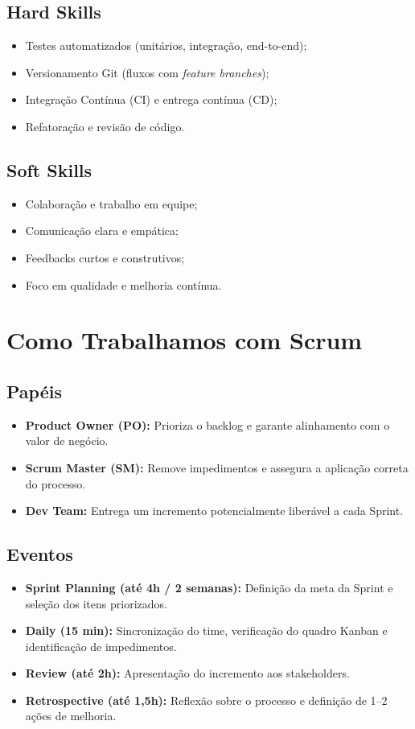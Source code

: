\documentclass{article}
\begin{document}
\subsection*{Hard Skills}
\begin{itemize}[noitemsep]
    \item Testes automatizados (unitários, integração, end-to-end);
    \item Versionamento Git (fluxos com \textit{feature branches});
    \item Integração Contínua (CI) e entrega contínua (CD);
    \item Refatoração e revisão de código.
\end{itemize}

\subsection*{Soft Skills}
\begin{itemize}[noitemsep]
    \item Colaboração e trabalho em equipe;
    \item Comunicação clara e empática;
    \item Feedbacks curtos e construtivos;
    \item Foco em qualidade e melhoria contínua.
\end{itemize}

\section{Como Trabalhamos com Scrum}

\subsection*{Papéis}
\begin{itemize}[noitemsep]
    \item \textbf{Product Owner (PO):} Prioriza o backlog e garante alinhamento com o valor de negócio.
    \item \textbf{Scrum Master (SM):} Remove impedimentos e assegura a aplicação correta do processo.
    \item \textbf{Dev Team:} Entrega um incremento potencialmente liberável a cada Sprint.
\end{itemize}

\subsection*{Eventos}
\begin{itemize}[noitemsep]
    \item \textbf{Sprint Planning (até 4h / 2 semanas):} Definição da meta da Sprint e seleção dos itens priorizados.
    \item \textbf{Daily (15 min):} Sincronização do time, verificação do quadro Kanban e identificação de impedimentos.
    \item \textbf{Review (até 2h):} Apresentação do incremento aos stakeholders.
    \item \textbf{Retrospective (até 1,5h):} Reflexão sobre o processo e definição de 1–2 ações de melhoria.
\end{itemize}
\end{document}

